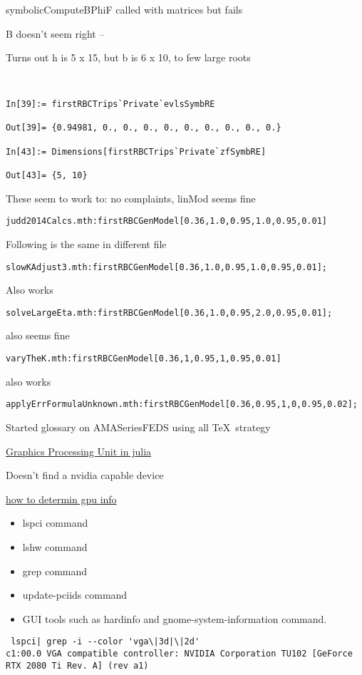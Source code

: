\documentclass[hyperref]{labbook}
\begin{document}
symbolicComputeBPhiF called with matrices but fails

B doesn't seem right -- 

Turns out  h is 5 x 15, but b is 6 x 10,  to few large roots


\begin{verbatim}


In[39]:= firstRBCTrips`Private`evlsSymbRE

Out[39]= {0.94981, 0., 0., 0., 0., 0., 0., 0., 0., 0.}

In[43]:= Dimensions[firstRBCTrips`Private`zfSymbRE]

Out[43]= {5, 10}

\end{verbatim}


These seem to work to: no complaints, linMod seems fine
\begin{verbatim}
judd2014Calcs.mth:firstRBCGenModel[0.36,1.0,0.95,1.0,0.95,0.01]
\end{verbatim}
Following is the same in different file
\begin{verbatim}
slowKAdjust3.mth:firstRBCGenModel[0.36,1.0,0.95,1.0,0.95,0.01];
\end{verbatim}
Also works
\begin{verbatim}
solveLargeEta.mth:firstRBCGenModel[0.36,1.0,0.95,2.0,0.95,0.01];
\end{verbatim}
also seems fine
\begin{verbatim}
varyTheK.mth:firstRBCGenModel[0.36,1,0.95,1,0.95,0.01]
\end{verbatim}
also works
\begin{verbatim}
applyErrFormulaUnknown.mth:firstRBCGenModel[0.36,0.95,1,0,0.95,0.02];
\end{verbatim}







Started glossary on AMASeriesFEDS using all \TeX\ strategy 


\href{https://nextjournal.com/sdanisch/julia-gpu-programming}{Graphics Processing Unit in julia}

Doesn't find a nvidia capable device

\href{https://www.cyberciti.biz/faq/linux-tell-which-graphics-vga-card-installed/}{how to determin gpu info}

\begin{itemize}
\item     lspci command
\item     lshw command
\item     grep command
\item     update-pciids command
\item     GUI tools such as hardinfo and gnome-system-information command.
\end{itemize}
\begin{verbatim}
 lspci| grep -i --color 'vga\|3d|\|2d'
c1:00.0 VGA compatible controller: NVIDIA Corporation TU102 [GeForce RTX 2080 Ti Rev. A] (rev a1)
\end{verbatim}
\end{document}
